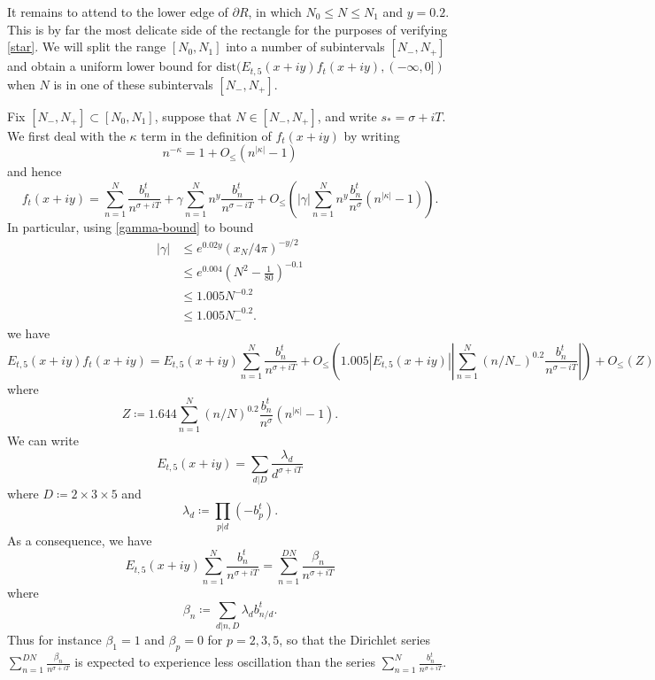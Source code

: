 It remains to attend to the lower edge of $\partial R$, in which $N_0 \leq N \leq N_1$ and $y=0.2$.  This is by far the most delicate side of the rectangle for the purposes of verifying \eqref{star}.  We will split the range $[N_0,N_1]$ into a number of subintervals $[N_-,N_+]$ and obtain a uniform lower bound for $\mathrm{dist}( E_{t,5}(x+iy) f_t(x+iy), (-\infty,0])$ when $N$ is in one of these subintervals $[N_-,N_+]$.

Fix $[N_-,N_+] \subset [N_0,N_1]$, suppose that $N \in [N_-,N_+]$, and write $s_* = \sigma + iT$.  We first deal with the $\kappa$ term in the definition of $f_t(x+iy)$ by writing
$$ n^{-\kappa} = 1 + O_{\leq}( n^{|\kappa|}-1)$$
and hence
\begin{equation}\label{ftxy}
 f_t(x+iy) = \sum_{n=1}^N \frac{b_n^t}{n^{\sigma+iT}} + \gamma \sum_{n=1}^N n^y \frac{b_n^t}{n^{\sigma-iT}}
+ O_{\leq}\left( |\gamma| \sum_{n=1}^N n^y \frac{b_n^t}{n^\sigma} (n^{|\kappa|}-1) \right).
\end{equation}
In particular, using \eqref{gamma-bound} to bound
\begin{align*}
|\gamma| &\leq e^{0.02y} (x_N/4\pi)^{-y/2} \\
&\leq e^{0.004} \left(N^2 - \frac{1}{80}  \right)^{-0.1} \\
&\leq 1.005 N^{-0.2} \\
&\leq 1.005 N_-^{-0.2}.
\end{align*}
we have
$$ E_{t,5}(x+iy) f_t(x+iy) = E_{t,5}(x+iy) \sum_{n=1}^N \frac{b_n^t}{n^{\sigma+iT}} + O_{\leq}\left( 1.005 |E_{t,5}(x+iy)| 
\left|\sum_{n=1}^N (n/N_-)^{0.2} \frac{b_n^t}{n^{\sigma-iT}}\right| \right)
+ O_{\leq}( Z )$$
where
$$ Z \coloneqq 1.644 \sum_{n=1}^N (n/N)^{0.2} \frac{b_n^t}{n^\sigma} (n^{|\kappa|}-1).$$
We can write
$$ E_{t,5}(x+iy) = \sum_{d|D} \frac{\lambda_d}{d^{\sigma+iT}}$$
where $D \coloneqq 2 \times 3 \times 5$ and
$$ \lambda_d \coloneqq \prod_{p|d} (-b_p^t).$$
As a consequence, we have
$$ E_{t,5}(x+iy) \sum_{n=1}^N \frac{b_n^t}{n^{\sigma+iT}} = \sum_{n=1}^{DN} \frac{\beta_{n}}{n^{\sigma+iT}}$$
where
$$ \beta_{n} \coloneqq \sum_{d|n,D} \lambda_d b_{n/d}^t.$$
Thus for instance $\beta_1 = 1$ and $\beta_p = 0$ for $p=2,3,5$, so that the Dirichlet series $\sum_{n=1}^{DN} \frac{\beta_n}{n^{\sigma+iT}}$ is expected to experience less oscillation than the series $\sum_{n=1}^N \frac{b_n^t}{n^{\sigma+iT}}$.

